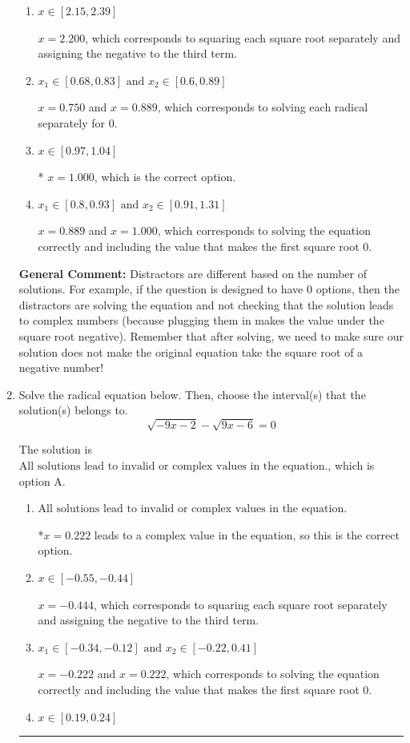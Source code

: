 \documentclass{extbook}[14pt]
\newcommand{\litem}[1]{\item #1

\rule{\textwidth}{0.4pt}}
\begin{document}
\begin{enumerate}
{\begin{enumerate}[label=\Alph*.]
This corresponds to believing the solution $x = 1.000$ leads to a complex value in the original equation.
\item \( x \in [2.15,2.39] \)

$x = 2.200$, which corresponds to squaring each square root separately and assigning the negative to the third term.
\item \( x_1 \in [0.68, 0.83] \text{ and } x_2 \in [0.6,0.89] \)

$x = 0.750$ and $x = 0.889$, which corresponds to solving each radical separately for 0.
\item \( x \in [0.97,1.04] \)

* $x = 1.000$, which is the correct option.
\item \( x_1 \in [0.8, 0.93] \text{ and } x_2 \in [0.91,1.31] \)

$x = 0.889$ and $x = 1.000$, which corresponds to solving the equation correctly and including the value that makes the first square root 0.
\end{enumerate}

\textbf{General Comment:} Distractors are different based on the number of solutions. For example, if the question is designed to have 0 options, then the distractors are solving the equation and not checking that the solution leads to complex numbers (because plugging them in makes the value under the square root negative). Remember that after solving, we need to make sure our solution does not make the original equation take the square root of a negative number!
}
\litem{
Solve the radical equation below. Then, choose the interval(s) that the solution(s) belongs to.
\[ \sqrt{-9 x - 2} - \sqrt{9 x - 6} = 0 \]

The solution is \( \text{All solutions lead to invalid or complex values in the equation.} \), which is option A.\begin{enumerate}[label=\Alph*.]
\item \( \text{All solutions lead to invalid or complex values in the equation.} \)

*$x = 0.222$ leads to a complex value in the equation, so this is the correct option.
\item \( x \in [-0.55,-0.44] \)

$x = -0.444$, which corresponds to squaring each square root separately and assigning the negative to the third term.
\item \( x_1 \in [-0.34, -0.12] \text{ and } x_2 \in [-0.22,0.41] \)

$x = -0.222$ and $x = 0.222$, which corresponds to solving the equation correctly and including the value that makes the first square root 0.
\item \( x \in [0.19,0.24] \)


\end{enumerate}}
\end{enumerate}
\end{document}
